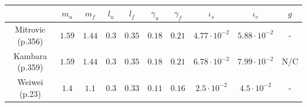 \documentclass[pdftex,a4paper,11pt]{report}
\numberwithin{equation}{subsection}
\begin{document}
\paragraph{}
\begin{small}
\begin{tabular}{|c|c|c|c|c|c|c|c|c|c|}
    \hline
             & $m_u$  & $m_f$  & $l_u$ & $l_f$  & $\gamma_u$ & $\gamma_f$ & $\iota_s$            & $\iota_e$            & $g$ \\
    \hline
    Mitrovic \cite{katayama1993} (p.356) 
             & $1.59$ & $1.44$ & $0.3$ & $0.35$ & $0.18$     & $0.21$     & $4.77 \cdot 10^{-2}$ & $5.88 \cdot 10^{-2}$ & - \\
    \hline
    Kambara  \cite{kambara2009} (p.359)
             & $1.59$ & $1.44$ & $0.3$ & $0.35$ & $0.18$     & $0.21$     & $6.78 \cdot 10^{-2}$ & $7.99 \cdot 10^{-2}$ & N/C \\
    \hline
    Weiwei   \cite{li2006} (p.23)
             & $1.4$  & $1.1$  & $0.3$ & $0.33$ & $0.11$     & $0.16$     & $2.5 \cdot 10^{-2}$  & $4.5 \cdot 10^{-2}$  & - \\
    \hline
\end{tabular}
\end{small}

\begin{figure}[h]
    \centering
    ~~~
    ~~~
\end{figure}
\end{document}
